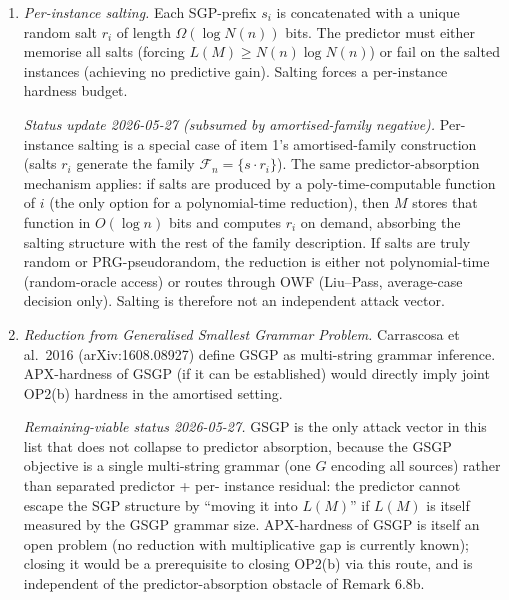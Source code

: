 \documentclass[
]{article}
\begin{document}
\begin{enumerate}
Liu--Pass / OWF route already documented in §13.2, which gives
average-case decision hardness under one-way functions, \emph{not}
worst-case multiplicative APX-hardness. None of (i)--(iii) yields
free-predictor worst-case OP2(b)-APX. \emph{Verdict.} The
amortised-family reformulation, taken in isolation, does not close
OP2(b)-APX. The single-source predictor-absorption obstacle of
Remark 6.8b transfers verbatim to the family-description scale;
the amortisation is symmetric across YES/NO branches and dilutes
the gap to $1+o(1)$ under any poly-time-samplable family.
\item \emph{Per-instance salting.} Each SGP-prefix $s_i$ is concatenated
with a unique random salt $r_i$ of length $\Omega(\log N(n))$ bits.
The predictor must either memorise all salts (forcing $L(M) \geq
N(n) \log N(n)$) or fail on the salted instances (achieving no
predictive gain). Salting forces a per-instance hardness budget.

\emph{Status update 2026-05-27 (subsumed by amortised-family
negative).} Per-instance salting is a special case of item 1's
amortised-family construction (salts $r_i$ generate the family
$\mathcal{F}_n = \{s \cdot r_i\}$). The same predictor-absorption
mechanism applies: if salts are produced by a poly-time-computable
function of $i$ (the only option for a polynomial-time reduction),
then $M$ stores that function in $O(\log n)$ bits and computes
$r_i$ on demand, absorbing the salting structure with the rest of
the family description. If salts are truly random or PRG-pseudo\-random,
the reduction is either not polynomial-time (random-oracle access)
or routes through OWF (Liu--Pass, average-case decision only).
Salting is therefore not an independent attack vector.
\item \emph{Reduction from Generalised Smallest Grammar Problem.}
Carrascosa et al.\ 2016 (arXiv:1608.08927) define GSGP as
multi-string grammar inference. APX-hardness of GSGP (if it can be
established) would directly imply joint OP2(b) hardness in the
amortised setting.

\emph{Remaining-viable status 2026-05-27.} GSGP is the only attack
vector in this list that does not collapse to predictor absorption,
because the GSGP objective is a single multi-string grammar (one
$G$ encoding all sources) rather than separated predictor + per-
instance residual: the predictor cannot escape the SGP structure
by ``moving it into $L(M)$'' if $L(M)$ is itself measured by the
GSGP grammar size. APX-hardness of GSGP is itself an open problem
(no reduction with multiplicative gap is currently known); closing
it would be a prerequisite to closing OP2(b) via this route, and
is independent of the predictor-absorption obstacle of Remark 6.8b.


\end{enumerate}
\end{document}
